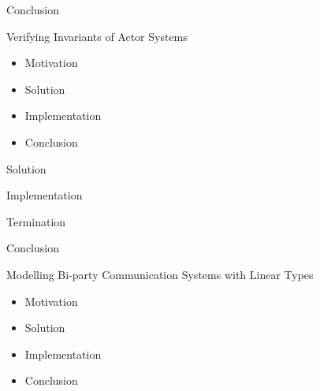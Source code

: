 \documentclass[ignorenonframetext,]{beamer}
\providecommand{\tightlist}{%
  \setlength{\itemsep}{0pt}\setlength{\parskip}{0pt}}
\begin{document}
\begin{frame}{%
\protect\hypertarget{conclusion}{%
Conclusion}}

\end{frame}

\begin{frame}{%
\protect\hypertarget{verifying-invariants-of-actor-systems}{%
Verifying Invariants of Actor Systems}}

\begin{itemize}
\tightlist
\item
  Motivation
\item
  Solution
\item
  Implementation
\item
  Conclusion
\end{itemize}

\end{frame}

\begin{frame}{%
\protect\hypertarget{solution-1}{%
Solution}}

\end{frame}

\begin{frame}{%
\protect\hypertarget{implementation-1}{%
Implementation}}

\end{frame}

\begin{frame}{%
\protect\hypertarget{termination-1}{%
Termination}}

\end{frame}

\begin{frame}{%
\protect\hypertarget{conclusion-1}{%
Conclusion}}

\end{frame}

\begin{frame}{%
\protect\hypertarget{modelling-bi-party-communication-systems-with-linear-types}{%
Modelling Bi-party Communication Systems with Linear Types}}

\begin{itemize}
\tightlist
\item
  Motivation
\item
  Solution
\item
  Implementation
\item
  Conclusion
\end{itemize}

\end{frame}
\end{document}
